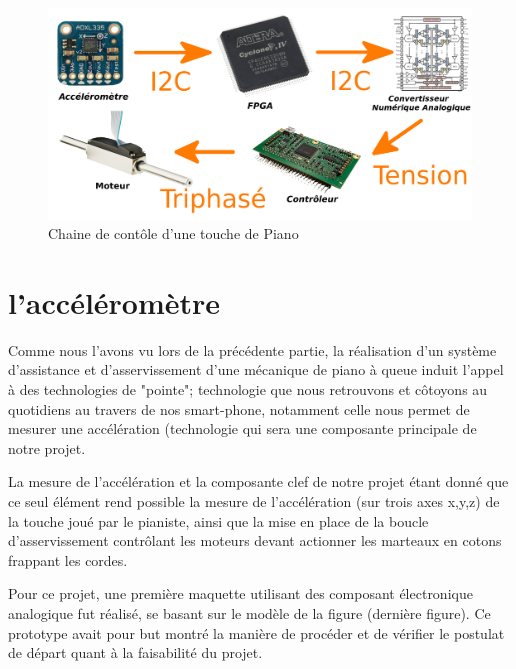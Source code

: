 \documentclass[french,a4paper,12pt]{report}
\begin{document}
		\begin{figure}[!ht]
    \center
  	\includegraphics[width=17cm]{CH.png}
    \caption{Chaine de contôle d'une touche de Piano}
	\end{figure}
	
			\section{l'accéléromètre}
						
			Comme nous l'avons vu lors de la précédente partie, la réalisation d'un système d'assistance et d'asservissement d'une mécanique de piano à queue induit l'appel à des technologies de "pointe"; technologie que nous retrouvons et côtoyons au quotidiens au travers de nos smart-phone, notamment celle nous permet de mesurer une accélération (technologie qui sera une composante principale de notre projet.
 
La mesure de l'accélération et la composante clef de notre projet étant donné que ce seul élément rend possible la mesure de l'accélération (sur trois axes x,y,z) de la touche joué par le pianiste, ainsi que la mise en place de la boucle d'asservissement contrôlant les moteurs devant actionner les marteaux en cotons frappant les cordes.

			
			Pour ce projet, une première maquette utilisant des composant électronique analogique fut réalisé, se basant sur le modèle de la figure (dernière figure). Ce prototype avait pour but montré la manière de procéder et de vérifier le postulat de départ quant à la faisabilité du projet.
 
\end{document}
